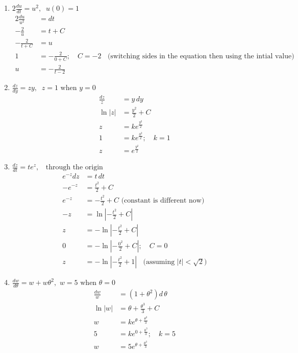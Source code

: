 \documentclass[11pt,letterpaper]{article}
\begin{document}
\begin{enumerate}
\begin{enumerate}
\vspace{0.5pc}
\item $2\frac{du}{dt}=u^2,\;\;u(0)=1$
\begin{align*}
2\frac{du}{u^2} &= dt \\
-\frac{2}{u} &= t+C \\
-\frac{2}{t+C} &= u \\
1 &= -\frac{2}{0+C};\quad C=-2\;\;\text{ (switching sides in the equation then using the intial value)} \\
u &= -\frac{2}{t-2}
\end{align*}

\vspace{0.5pc}
\item $\frac{dz}{dy}=zy,\;\;z=1\text{ when }y=0$
\begin{align*}
\frac{dz}{z} &= y\,dy \\
\ln{|z|} &= \frac{y^2}{2}+C \\
z &= ke^{\frac{y^2}{2}} \\
1 &= ke^{\frac{0^2}{2}};\quad k=1 \\
z &= e^{\frac{y^2}{2}}
\end{align*}

\vspace{1pc}
\item $\frac{dz}{dt}=te^z,\;\;\text{ through the origin}$
\begin{align*}
e^{-z}dz &= t\,dt \\
-e^{-z} &= \frac{t^2}{2}+C \\
e^{-z} &= -\frac{t^2}{2}+C \text{ (constant is different now)} \\
-z &= \ln{\left|-\frac{t^2}{2}+C\right|} \\
z &= -\ln{\left|-\frac{t^2}{2}+C\right|} \\
0 &= -\ln{\left|-\frac{0^2}{2}+C\right|};\quad C=0 \\
z &= -\ln{\left|-\frac{t^2}{2}+1\right|}\;\;\text{ (assuming $|t|<\sqrt{2}$)} 
\end{align*}

\vspace{1pc}
\item $\frac{dw}{d\theta}=w+w\theta^2,\,\,w=5\text{ when }\theta=0$
\begin{align*}
\frac{dw}{w} &= (1+\theta^2)d\,\theta \\
\ln{|w|} &= \theta+\frac{\theta^3}{3}+C \\
w &= ke^{\theta+\frac{\theta^3}{3}} \\
5 &= ke^{0+\frac{0^3}{3}};\quad k=5 \\
w &= 5e^{\theta+\frac{\theta^3}{3}}
\end{align*}

\end{enumerate}

\end{enumerate}
\end{document}
